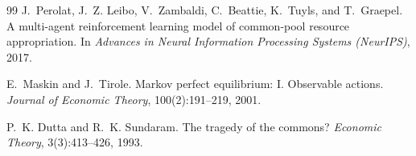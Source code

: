 \documentclass{article}
\begin{document}
\begin{thebibliography}{99}
J.~Perolat, J.~Z. Leibo, V.~Zambaldi, C.~Beattie, K.~Tuyls, and T.~Graepel.
\newblock A multi-agent reinforcement learning model of common-pool resource appropriation.
\newblock In \textit{Advances in Neural Information Processing Systems (NeurIPS)}, 2017.

E.~Maskin and J.~Tirole.
\newblock Markov perfect equilibrium: I. Observable actions.
\newblock \textit{Journal of Economic Theory}, 100(2):191--219, 2001.

P.~K. Dutta and R.~K. Sundaram.
\newblock The tragedy of the commons?
\newblock \textit{Economic Theory}, 3(3):413--426, 1993.

\end{thebibliography}
\end{document}
